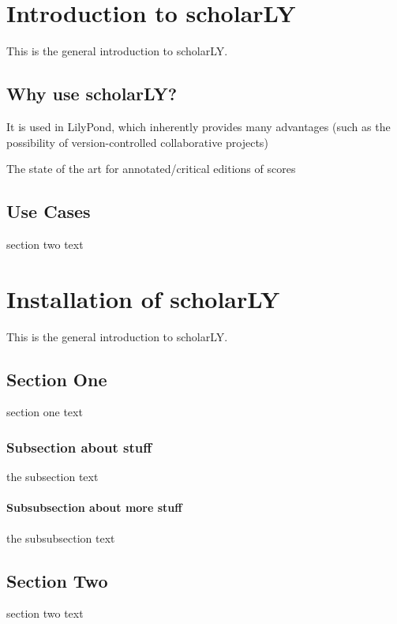 \documentclass[letterpaper,10pt,english]{sphinxmanual}
\begin{document}
\chapter{Introduction to scholarLY}
\label{\detokenize{introduction:introduction-to-scholarly}}\label{\detokenize{introduction::doc}}
This is the general introduction to scholarLY.


\section{Why use scholarLY?}
\label{\detokenize{introduction:why-use-scholarly}}
It is used in LilyPond, which inherently provides many advantages
(such as the possibility of version-controlled collaborative projects)

The state of the art for annotated/critical editions of scores


\section{Use Cases}
\label{\detokenize{introduction:use-cases}}
section two text


\chapter{Installation of scholarLY}
\label{\detokenize{installation::doc}}\label{\detokenize{installation:installation-of-scholarly}}
This is the general introduction to scholarLY.


\section{Section One}
\label{\detokenize{installation:section-one}}
section one text


\subsection{Subsection about stuff}
\label{\detokenize{installation:subsection-about-stuff}}
the subsection text


\subsubsection{Subsubsection about more stuff}
\label{\detokenize{installation:subsubsection-about-more-stuff}}
the subsubsection text


\section{Section Two}
\label{\detokenize{installation:section-two}}
section two text
\end{document}
